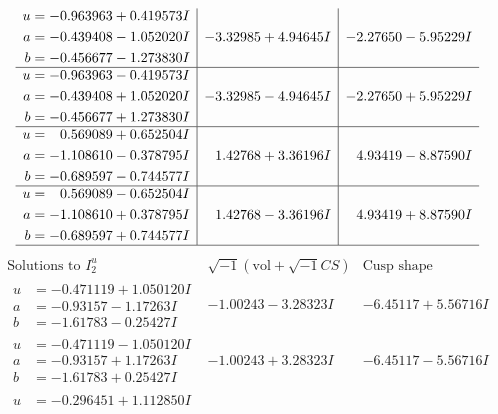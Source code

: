\documentclass[1p]{elsarticle_modified}
\theoremstyle{definition}
\newcommand{\I}{\sqrt{-1}}
\begin{document}
$$\begin{array}{c|c|c}
\begin{aligned}
u &= -0.963963 + 0.419573 I \\
a &= -0.439408 - 1.052020 I \\
b &= -0.456677 - 1.273830 I\end{aligned}
 & -3.32985 + 4.94645 I & -2.27650 - 5.95229 I \\ \hline\begin{aligned}
u &= -0.963963 - 0.419573 I \\
a &= -0.439408 + 1.052020 I \\
b &= -0.456677 + 1.273830 I\end{aligned}
 & -3.32985 - 4.94645 I & -2.27650 + 5.95229 I \\ \hline\begin{aligned}
u &= \phantom{-}0.569089 + 0.652504 I \\
a &= -1.108610 - 0.378795 I \\
b &= -0.689597 - 0.744577 I\end{aligned}
 & \phantom{-}1.42768 + 3.36196 I & \phantom{-}4.93419 - 8.87590 I \\ \hline\begin{aligned}
u &= \phantom{-}0.569089 - 0.652504 I \\
a &= -1.108610 + 0.378795 I \\
b &= -0.689597 + 0.744577 I\end{aligned}
 & \phantom{-}1.42768 - 3.36196 I & \phantom{-}4.93419 + 8.87590 I\\
 \hline 
 \end{array}$$\newpage$$\begin{array}{c|c|c}  
\text{Solutions to }I^u_{2}& \I (\text{vol} + \sqrt{-1}CS) & \text{Cusp shape}\\
 \hline 
\begin{aligned}
u &= -0.471119 + 1.050120 I \\
a &= -0.93157 - 1.17263 I \\
b &= -1.61783 - 0.25427 I\end{aligned}
 & -1.00243 - 3.28323 I & -6.45117 + 5.56716 I \\ \hline\begin{aligned}
u &= -0.471119 - 1.050120 I \\
a &= -0.93157 + 1.17263 I \\
b &= -1.61783 + 0.25427 I\end{aligned}
 & -1.00243 + 3.28323 I & -6.45117 - 5.56716 I \\ \hline\begin{aligned}
u &= -0.296451 + 1.112850 I \\

\end{aligned}
\end{array}$$
\end{document}
